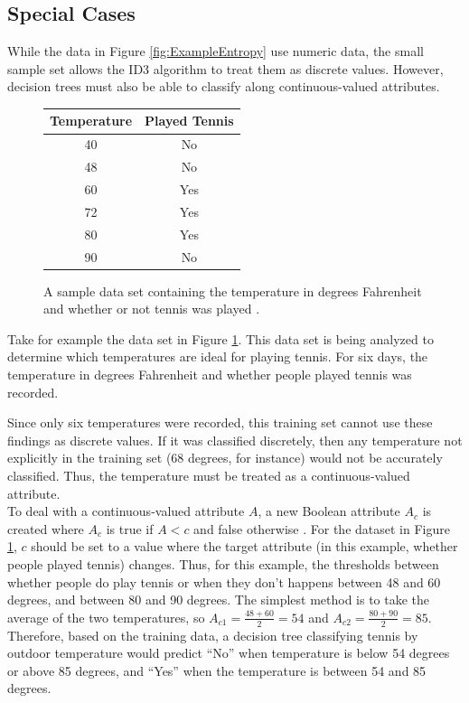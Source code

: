 \subsection{Special Cases}
While the data in Figure \ref{fig:ExampleEntropy} use numeric data, the small sample set allows the ID3 algorithm to treat them as discrete values. However, decision trees must also be able to classify along continuous-valued attributes.
\begin{figure}[H]
  \centering
  \begin{tabular}{| c | c |}
    Temperature & Played Tennis \\ \hline
    40 & No \\ \hline
    48 & No \\ \hline
    60 & Yes \\ \hline
    72 & Yes \\ \hline
    80 & Yes \\ \hline
    90 & No \\ \hline
  \end{tabular}
  \caption{A sample data set containing the temperature in degrees Fahrenheit and whether or not tennis was played \cite{mitc97}.}
  \label{fig:rangedValue}
\end{figure}

\begin{exmp}
  Take for example the data set in Figure \ref{fig:rangedValue}. This data set is being analyzed to determine which temperatures are ideal for playing tennis. For six days, the temperature in degrees Fahrenheit and whether people played tennis was recorded.\\
\end{exmp}

Since only six temperatures were recorded, this training set cannot use these findings as discrete values. If it was classified discretely, then any temperature not explicitly in the training set (68 degrees, for instance) would not be accurately classified. Thus, the temperature must be treated as a continuous-valued attribute.\\

To deal with a continuous-valued attribute $A$, a new Boolean attribute $A_c$ is created where $A_c$ is true if $A<c$ and false otherwise \cite{mitc97}. For the dataset in Figure \ref{fig:rangedValue}, $c$ should be set to a value where the target attribute (in this example, whether people played tennis) changes. Thus, for this example, the thresholds between whether people do play tennis or when they don't happens between 48 and 60 degrees, and between 80 and 90 degrees. The simplest method is to take the average of the two temperatures, so $A_{c1}=\frac{48+60}{2}=54$ and $A_{c2}=\frac{80+90}{2}=85$. Therefore, based on the training data, a decision tree classifying tennis by outdoor temperature would predict ``No'' when temperature is below 54 degrees or above 85 degrees, and ``Yes'' when the temperature is between 54 and 85 degrees.\\

